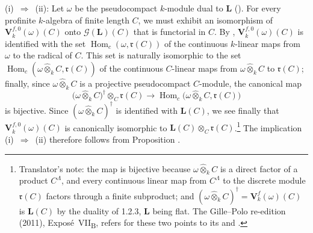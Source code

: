 \noindent\textup{(i)}~\(\Rightarrow\)~\textup{(ii)}: Let \(\omega\) be the pseudocompact
\(k\)-module dual to \(\mathbf L\) \textup{()}. For every profinite
\(k\)-algebra of finite length \(C\), we must exhibit an isomorphism of
\(\mathbf V_k^{f,0}(\omega)(C)\) onto \(\mathscr G(\mathbf L)(C)\) that is
functorial in \(C\). By , \(\mathbf V_k^{f,0}(\omega)(C)\) is identified
with the set \(\operatorname{Hom}_c(\omega,\mathfrak r(C))\) of the continuous
\(k\)-linear maps from \(\omega\) to the radical of \(C\). This set is
naturally isomorphic to the set
\(\operatorname{Hom}_c(\omega\widehat\otimes_kC,\mathfrak r(C))\) of the continuous
\(C\)-linear maps from \(\omega\widehat\otimes_kC\) to \(\mathfrak r(C)\);
finally, since \(\omega\widehat\otimes_kC\) is a projective pseudocompact
\(C\)-module, the canonical map
\[
  \bigl(\omega\widehat\otimes_kC\bigr)^\dagger
  \otimes_C\mathfrak r(C)
  \longrightarrow
  \operatorname{Hom}_c\bigl(
    \omega\widehat\otimes_kC,\mathfrak r(C)
  \bigr)
\]
is bijective. Since \((\omega\widehat\otimes_kC)^\dagger\) is identified with
\(\mathbf L(C)\), we see finally that \(\mathbf V_k^{f,0}(\omega)(C)\) is
canonically isomorphic to \(\mathbf L(C)\otimes_C\mathfrak r(C)\).\footnote{Translator's note: the map
is bijective because \(\omega\widehat\otimes_kC\) is a direct factor of a product \(C^\Lambda\), and every continuous
linear map from \(C^\Lambda\) to the discrete module \(\mathfrak r(C)\) factors through a finite subproduct;
and \((\omega\widehat\otimes_kC)^\dagger=\mathbf V_k^f(\omega)(C)\) is \(\mathbf L(C)\) by the duality of 1.2.3,
\(\mathbf L\) being flat. The Gille--Polo re-edition (2011), Expos\'e~VII\textsubscript{B}, refers for these two
points to its  and .} The
implication \textup{(i)}~\(\Rightarrow\)~\textup{(ii)} therefore follows from
Proposition .

